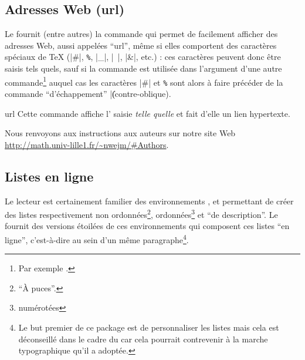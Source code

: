 \documentclass[french,nolocaltoc]{nwejmart}
\newtheorem[style=definition]{fait}
\newtheorem[title=expérience]{experience}
\newtheorem[title-plural=anneaux]{anneau}
\newtheorem[title=idéal,title-plural=idéaux]{ideal}
\begin{document}

\subsection{Adresses Web (\texorpdfstring{\acrshort{url}}{URL})}
\label{sec-url}

Le  fournit (entre autres) la commande  qui
permet de facilement afficher des adresses Web, aussi appelées
\enquote{\gls{url}}, même si elles comportent des caractères spéciaux de \TeX{}
(|#|,
%
\lstinline[commentstyle={}]+%+,
%
|_|, |~|, |&|, etc.) : ces caractères peuvent donc être saisis tels quels, sauf
si la commande  est utilisée dans l'argument d'une autre
commande\footnote{Par exemple \protect{}.} auquel cas les
caractères |#| et
%
\lstinline[commentstyle={}]+%+
%
sont alors à faire précéder de la commande \enquote{d'échappement} |\|
(contre-oblique).%

\begin{docCommand}{url}{}
  Cette commande affiche l' saisie \emph{telle quelle} et fait
  d'elle un lien hypertexte.
\begin{bodycode}[listing and text,listing options={alsolanguage={[hyperref]TeX},deletekeywords={[2]url}}]
Nous renvoyons aux instructions aux auteurs sur notre site Web
\url{http://math.univ-lille1.fr/~nwejm/#Authors}.
\end{bodycode}
\end{docCommand}

\subsection{Listes en ligne}
\label{sec:listes-en-ligne}

Le lecteur est certainement familier des environnements
,  et
 permettant de créer des listes respectivement
non ordonnées\footnote{\enquote{À puces}.}, ordonnées\footnote{\Ie*{}
  numérotées} et \enquote{de description}. Le  fournit des
versions étoilées de ces environnements qui composent ces listes \enquote{en
  ligne}, c'est-à-dire au sein d'un même paragraphe\footnote{Le but premier de
  ce package est de personnaliser les listes mais cela est déconseillé dans le
  cadre du \nwejm{} car cela pourrait contrevenir à la marche typographique
  qu'il a adoptée.}.
\end{document}
